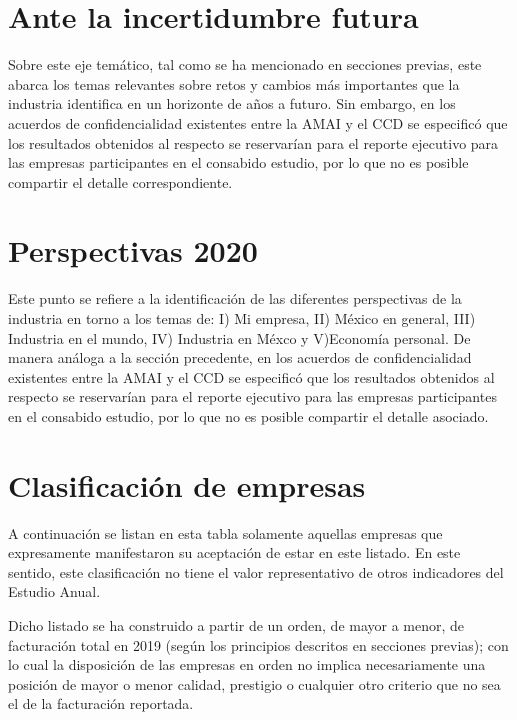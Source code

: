 \section{Ante la incertidumbre futura}

Sobre este eje temático, tal como se ha mencionado en secciones previas, este abarca los temas relevantes sobre retos y cambios más importantes que la industria identifica en un horizonte de años a futuro. Sin embargo, en los acuerdos de confidencialidad existentes entre la AMAI y el CCD se especificó que los resultados obtenidos al respecto se reservarían para el reporte ejecutivo para las empresas participantes en el consabido estudio, por lo que no es posible compartir el detalle correspondiente.

\section{Perspectivas 2020}

Este punto se refiere a la identificación de las diferentes perspectivas de la industria en torno a los temas de: I) Mi empresa, II) México en general, III) Industria en el mundo, IV) Industria en Méxco y V)Economía personal. De manera análoga a la sección precedente, en los acuerdos de confidencialidad existentes entre la AMAI y el CCD se especificó que los resultados obtenidos al respecto se reservarían para el reporte ejecutivo para las empresas participantes en el consabido estudio, por lo que no es posible compartir el detalle asociado.

\section{Clasificación de empresas}

A continuación se listan en esta tabla solamente aquellas empresas que expresamente manifestaron su aceptación de estar en este listado. En este sentido, este clasificación no tiene el valor representativo de otros indicadores del Estudio Anual. 

Dicho listado se ha construido a partir de un orden, de mayor a menor, de facturación total en 2019 (según los principios descritos en secciones previas); con lo cual la disposición de las empresas en orden no implica necesariamente una posición de mayor o menor calidad, prestigio o cualquier otro criterio que no sea el de la facturación reportada.

